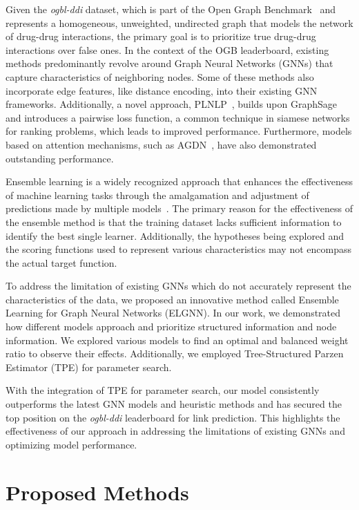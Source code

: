 \documentclass[11pt]{article}
\begin{document}
Given the \textit{ogbl-ddi} dataset, which is part of the Open Graph Benchmark~\cite{hu2020open} and represents a homogeneous, unweighted, undirected graph that models the network of drug-drug interactions, the primary goal is to prioritize true drug-drug interactions over false ones. In the context of the OGB leaderboard, existing methods predominantly revolve around Graph Neural Networks (GNNs) that capture characteristics of neighboring nodes. Some of these methods also incorporate edge features, like distance encoding, into their existing GNN frameworks. Additionally, a novel approach, PLNLP~\cite{wang2021pairwise}, builds upon GraphSage~\cite{hamilton2017inductive} and introduces a pairwise loss function, a common technique in siamese networks for ranking problems, which leads to improved performance. Furthermore, models based on attention mechanisms, such as AGDN~\cite{sun2020adaptive}, have also demonstrated outstanding performance. 

Ensemble learning is a widely recognized approach that enhances the effectiveness of machine learning tasks through the amalgamation and adjustment of predictions made by multiple models~\cite{yue2023relation, dietterich2000ensemble}. The primary reason for the effectiveness of the ensemble method is that the training dataset lacks sufficient information to identify the best single learner. Additionally, the hypotheses being explored and the scoring functions used to represent various characteristics may not encompass the actual target function. 

To address the limitation of existing GNNs which do not accurately represent the characteristics of the data, 
we proposed an innovative method called Ensemble Learning for Graph Neural Networks (ELGNN). In our work, we demonstrated how different models approach and prioritize structured information and node information. We explored various models to find an optimal and balanced weight ratio to observe their effects. Additionally, we employed Tree-Structured Parzen Estimator (TPE) for parameter search. 

With the integration of TPE for parameter search, our model consistently outperforms the latest GNN models and heuristic methods and has secured the top position on the \textit{ogbl-ddi} leaderboard for link prediction. This highlights the effectiveness of our approach in addressing the limitations of existing GNNs and optimizing model performance. 

\section{Proposed Methods}
\end{document}
